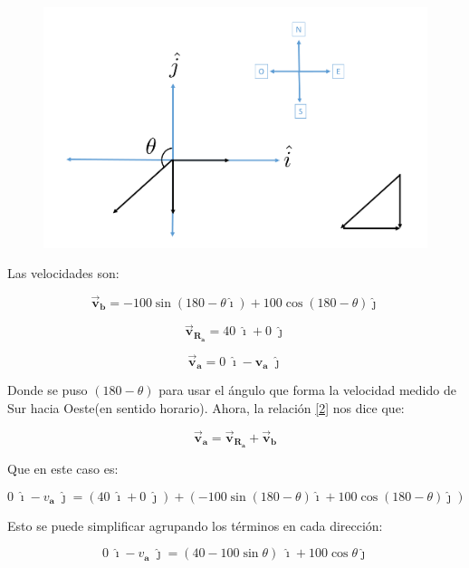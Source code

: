 \documentclass[a4paper,11pt]{article}
\begin{document}
	
	
	
	
	\begin{figure}[h]
		\includegraphics[width=1.0\linewidth]{./im/4}
	\end{figure}
	
	Las velocidades son:
	
	$$   \vec{\textbf{v}}_{\textbf{b}}  = -100 \sin (180-\theta \boldsymbol{\hat{\imath}}) + 100\cos (180-\theta) \boldsymbol{\hat{\jmath}} $$
	
	$$ \vec{\textbf{v}}_{\textbf{R}_\textbf{a}}  = 40\; \boldsymbol{\hat{\imath}} + 0\; \boldsymbol{\hat{\jmath}}  $$
	
	$$ \vec{\textbf{v}}_{\textbf{a}} = 0\; \boldsymbol{\hat{\imath}} -\textbf{v}_{\textbf{a}} \; \boldsymbol{\hat{\jmath}}   $$
	
	Donde se puso $(180-\theta)$ para usar el ángulo que forma la velocidad medido de Sur hacia Oeste(en sentido horario). Ahora, la relación \ref{2} nos dice que:
	
	
	
	$$
	\vec{\textbf{v}}_{\textbf{a}} = \vec{\textbf{v}}_{\textbf{R}_\textbf{a}} + \vec{\textbf{v}}_{\textbf{b}}$$
	
	
	Que en este caso es:
	
	
	$$
	0\; \boldsymbol{\hat{\imath}}-{v}_{\textbf{a}} \; \boldsymbol{\hat{\jmath}}  = (40\; \boldsymbol{\hat{\imath}}+ 0\; \boldsymbol{\hat{\jmath}} ) + (-100 \sin(180-\theta) \boldsymbol{\hat{\imath}} + 100\cos(180-\theta) \boldsymbol{\hat{\jmath}})   
	$$
	
	
	Esto se puede simplificar agrupando los términos en cada dirección:
	
	
	\begin{equation}
	0\; \boldsymbol{\hat{\imath}}-{v}_{\textbf{a}} \; \boldsymbol{\hat{\jmath}}  = (40 -100 \sin \theta)\; \boldsymbol{\hat{\imath}} + 100\cos \theta \boldsymbol{\hat{\jmath}}   
	\end{equation}
	
\end{document}
